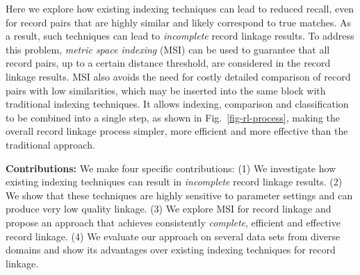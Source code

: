 \documentclass{llncs}
\begin{document}

Here we explore how existing indexing techniques can lead to
reduced recall, even for record pairs that are highly similar and likely
correspond to true matches. As a result, such techniques can lead
to \emph{incomplete} record linkage results. To address this problem,
\emph{metric space indexing} (MSI) can be used to guarantee that all
record pairs, up to a certain distance threshold, are considered in the
record linkage results. MSI also avoids the need for costly detailed
comparison of record pairs with low similarities, which may be inserted
into the same block with traditional indexing techniques. It allows
indexing, comparison and classification to be combined into a
single step, as shown in Fig.~\ref{fig-rl-process}, making the overall
record linkage process simpler, more efficient and more effective than
the traditional approach.





\smallskip
\textbf{Contributions:} We make four specific contributions: (1) We
investigate how existing indexing techniques can result in
\emph{incomplete} record linkage results. (2) We show that these
techniques are highly sensitive to parameter settings and can produce
very low quality linkage. (3) We explore MSI for record linkage and
propose an approach that achieves consistently \emph{complete},
efficient and effective record linkage. (4) We evaluate our approach on
several data sets from diverse domains and show its advantages over
existing indexing techniques for record linkage.


\end{document}
